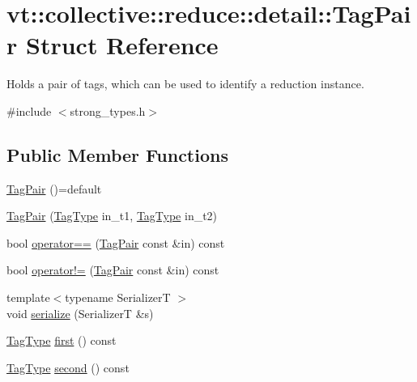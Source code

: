\hypertarget{structvt_1_1collective_1_1reduce_1_1detail_1_1_tag_pair}{}\section{vt\+:\+:collective\+:\+:reduce\+:\+:detail\+:\+:Tag\+Pair Struct Reference}
\label{structvt_1_1collective_1_1reduce_1_1detail_1_1_tag_pair}


Holds a pair of tags, which can be used to identify a reduction instance.  




{\ttfamily \#include $<$strong\+\_\+types.\+h$>$}

\subsection*{Public Member Functions}
\begin{DoxyCompactItemize}
\item 
\hyperlink{structvt_1_1collective_1_1reduce_1_1detail_1_1_tag_pair_a91e1f46e160d495cd07384408526656b}{Tag\+Pair} ()=default
\item 
\hyperlink{structvt_1_1collective_1_1reduce_1_1detail_1_1_tag_pair_aaab6b3334a06019160dd6451575b03aa}{Tag\+Pair} (\hyperlink{namespacevt_a84ab281dae04a52a4b243d6bf62d0e52}{Tag\+Type} in\+\_\+t1, \hyperlink{namespacevt_a84ab281dae04a52a4b243d6bf62d0e52}{Tag\+Type} in\+\_\+t2)
\item 
bool \hyperlink{structvt_1_1collective_1_1reduce_1_1detail_1_1_tag_pair_ab04262da51d82ac0ec9da44c9f453f88}{operator==} (\hyperlink{structvt_1_1collective_1_1reduce_1_1detail_1_1_tag_pair}{Tag\+Pair} const \&in) const
\item 
bool \hyperlink{structvt_1_1collective_1_1reduce_1_1detail_1_1_tag_pair_a99d3a92b554bc3972bea8fd3514c2895}{operator!=} (\hyperlink{structvt_1_1collective_1_1reduce_1_1detail_1_1_tag_pair}{Tag\+Pair} const \&in) const
\item 
{\footnotesize template$<$typename SerializerT $>$ }\\void \hyperlink{structvt_1_1collective_1_1reduce_1_1detail_1_1_tag_pair_a4b102cb93ddcca20683a431ae497ae62}{serialize} (SerializerT \&s)
\item 
\hyperlink{namespacevt_a84ab281dae04a52a4b243d6bf62d0e52}{Tag\+Type} \hyperlink{structvt_1_1collective_1_1reduce_1_1detail_1_1_tag_pair_a48b086b80a8acf1b47b4327a673de7f0}{first} () const
\item 
\hyperlink{namespacevt_a84ab281dae04a52a4b243d6bf62d0e52}{Tag\+Type} \hyperlink{structvt_1_1collective_1_1reduce_1_1detail_1_1_tag_pair_a2cc1614fe4e8c5c1798579abd0b13bdc}{second} () const
\end{DoxyCompactItemize}
